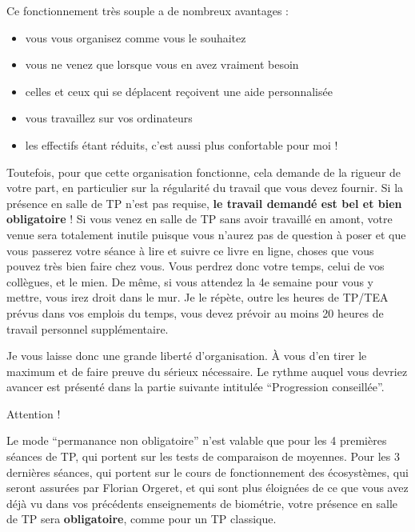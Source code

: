 \documentclass[
  french,
  a4paper,
  DIV=11,
  numbers=noendperiod,
  oneside]{scrreprt}
\providecommand{\tightlist}{%
  \setlength{\itemsep}{0pt}\setlength{\parskip}{0pt}}
\begin{document}
Ce fonctionnement très souple a de nombreux avantages :

\begin{itemize}
\tightlist
\item
  vous vous organisez comme vous le souhaitez
\item
  vous ne venez que lorsque vous en avez vraiment besoin
\item
  celles et ceux qui se déplacent reçoivent une aide personnalisée
\item
  vous travaillez sur vos ordinateurs
\item
  les effectifs étant réduits, c'est aussi plus confortable pour moi !
\end{itemize}

Toutefois, pour que cette organisation fonctionne, cela demande de la
rigueur de votre part, en particulier sur la régularité du travail que
vous devez fournir. Si la présence en salle de TP n'est pas requise,
\textbf{le travail demandé est bel et bien obligatoire} ! Si vous venez
en salle de TP sans avoir travaillé en amont, votre venue sera
totalement inutile puisque vous n'aurez pas de question à poser et que
vous passerez votre séance à lire et suivre ce livre en ligne, choses
que vous pouvez très bien faire chez vous. Vous perdrez donc votre
temps, celui de vos collègues, et le mien. De même, si vous attendez la
4e semaine pour vous y mettre, vous irez droit dans le mur. Je le
répète, outre les heures de TP/TEA prévus dans vos emplois du temps,
vous devez prévoir au moins 20 heures de travail personnel
supplémentaire.

Je vous laisse donc une grande liberté d'organisation. À vous d'en tirer
le maximum et de faire preuve du sérieux nécessaire. Le rythme auquel
vous devriez avancer est présenté dans la partie suivante intitulée
``Progression conseillée''.

\begin{tcolorbox}[enhanced jigsaw, arc=.35mm, bottomrule=.15mm, bottomtitle=1mm, breakable, colback=white, colbacktitle=quarto-callout-important-color!10!white, colframe=quarto-callout-important-color-frame, coltitle=black, left=2mm, leftrule=.75mm, opacityback=0, opacitybacktitle=0.6, rightrule=.15mm, title=\textcolor{quarto-callout-important-color}{\faExclamation}\hspace{0.5em}{Important}, titlerule=0mm, toprule=.15mm, toptitle=1mm]

Attention !

Le mode ``permanance non obligatoire'' n'est valable que pour les 4
premières séances de TP, qui portent sur les tests de comparaison de
moyennes. Pour les 3 dernières séances, qui portent sur le cours de
fonctionnement des écosystèmes, qui seront assurées par Florian Orgeret,
et qui sont plus éloignées de ce que vous avez déjà vu dans vos
précédents enseignements de biométrie, votre présence en salle de TP
sera \textbf{obligatoire}, comme pour un TP classique.

\end{tcolorbox}
\end{document}
